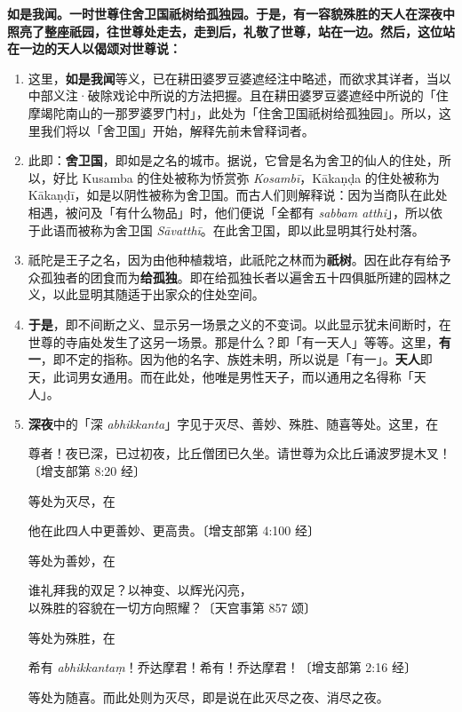 \textbf{如是我闻。一时世尊住舍卫国祇树给孤独园。于是，有一容貌殊胜的天人在深夜中照亮了整座祇园，往世尊处走去，走到后，礼敬了世尊，站在一边。然后，这位站在一边的天人以偈颂对世尊说：}

\begin{enumerate}\item 这里，\textbf{如是我闻}等义，已在耕田婆罗豆婆遮经注中略述，而欲求其详者，当以中部义注·破除戏论中所说的方法把握。且在耕田婆罗豆婆遮经中所说的「住摩竭陀南山的一那罗婆罗门村」，此处为「住舍卫国祇树给孤独园」。所以，这里我们将以「舍卫国」开始，解释先前未曾释词者。
\item 此即：\textbf{舍卫国}，即如是之名的城市。据说，它曾是名为舍卫的仙人的住处，所以，好比 Kusamba 的住处被称为㤭赏弥 \textit{Kosambī}，Kākaṇḍa 的住处被称为 Kākaṇḍī，如是以阴性被称为舍卫国。而古人们则解释说：因为当商队在此处相遇，被问及「有什么物品」时，他们便说「全都有 \textit{sabbam atthi}」，所以依于此语而被称为舍卫国 \textit{Sāvatthī}。在此舍卫国，即以此显明其行处村落。
\item 祇陀是王子之名，因为由他种植栽培，此祇陀之林而为\textbf{祇树}。因在此存有给予众孤独者的团食而为\textbf{给孤独}。即在给孤独长者以遍舍五十四俱胝所建的园林之义，以此显明其随适于出家众的住处空间。
\item \textbf{于是}，即不间断之义、显示另一场景之义的不变词。以此显示犹未间断时，在世尊的寺庙处发生了这另一场景。那是什么？即「有一天人」等等。这里，\textbf{有一}，即不定的指称。因为他的名字、族姓未明，所以说是「有一」。\textbf{天人}即天，此词男女通用。而在此处，他唯是男性天子，而以通用之名得称「天人」。
\item \textbf{深夜}中的「深 \textit{abhikkanta}」字见于灭尽、善妙、殊胜、随喜等处。这里，在\begin{quoting}尊者！夜已深，已过初夜，比丘僧团已久坐。请世尊为众比丘诵波罗提木叉！{\bluefootnotesize 〔增支部第 8:20 经〕}\end{quoting}等处为灭尽，在\begin{quoting}他在此四人中更善妙、更高贵。{\bluefootnotesize 〔增支部第 4:100 经〕}\end{quoting}等处为善妙，在\begin{quoting}谁礼拜我的双足？以神变、以辉光闪亮，\\以殊胜的容貌在一切方向照耀？{\bluefootnotesize 〔天宫事第 857 颂〕}\end{quoting}等处为殊胜，在\begin{quoting}希有 \textit{abhikkantaṃ}！乔达摩君！希有！乔达摩君！{\bluefootnotesize 〔增支部第 2:16 经〕}\end{quoting}等处为随喜。而此处则为灭尽，即是说在此灭尽之夜、消尽之夜。

\end{enumerate}
